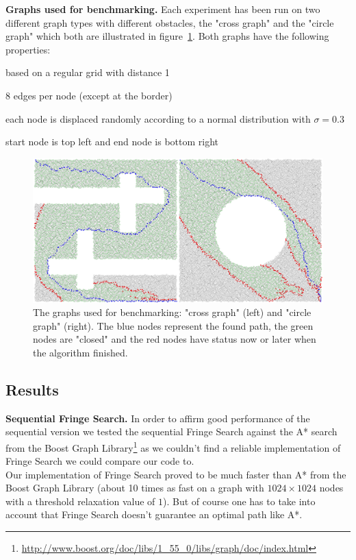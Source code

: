 \documentclass[letterpaper]{article}
\newcommand{\mypar}[1]{{\bf #1.}}
\begin{document}
\mypar{Graphs used for benchmarking}
Each experiment has been run on two different graph types with different obstacles, the "cross graph" and the "circle graph" which both are illustrated in figure~\ref{fig:graphs}. Both graphs have the following properties:
\begin{compactitem}
\item based on a regular grid with distance 1
\item 8 edges per node (except at the border)
\item each node is displaced randomly according to a normal distribution with $\sigma = 0.3$
\item start node is top left and end node is bottom right
\end{compactitem}

\begin{figure}[h]\centering
  \includegraphics[scale=0.3]{benchmark_graphs.eps}
  \caption{The graphs used for benchmarking: "cross graph" (left) and "circle graph" (right). The blue nodes represent the found path, the green nodes are "closed" and the red nodes have status now or later when the algorithm finished. \label{fig:graphs}}
\end{figure}

\subsection{Results}\label{ssec:results}

\mypar{Sequential Fringe Search}
In order to affirm good performance of the sequential version we tested the sequential Fringe Search against the A* search from the Boost Graph Library\footnote{\url{http://www.boost.org/doc/libs/1_55_0/libs/graph/doc/index.html}} as we couldn't find a reliable implementation of Fringe Search we could compare our code to.\\
Our implementation of Fringe Search proved to be much faster than A* from the Boost Graph Library (about 10 times as fast on a graph with $1024 \times 1024$ nodes with a threshold relaxation value of $1$). But of course one has to take into account that Fringe Search doesn't guarantee an optimal path like A*.
\end{document}
